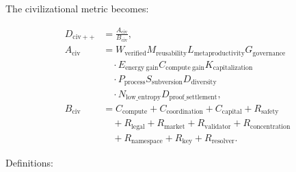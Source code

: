 \documentclass[
  11pt,
]{article}
\begin{document}
The civilizational metric becomes:

\[
\begin{aligned}
D_{\mathrm{civ++}}&=\frac{A_{\mathrm{civ}}}{B_{\mathrm{civ}}},\\[0.2em]
A_{\mathrm{civ}}&=W_{\mathrm{verified}}M_{\mathrm{reusability}}L_{\mathrm{metaproductivity}}
G_{\mathrm{governance}}\\
&\quad\cdot E_{\mathrm{energy\ gain}}C_{\mathrm{compute\ gain}}K_{\mathrm{capitalization}}\\
&\quad\cdot P_{\mathrm{process}}S_{\mathrm{subversion}}D_{\mathrm{diversity}}\\
&\quad\cdot N_{\mathrm{low\_entropy}}D_{\mathrm{proof\_settlement}},\\[0.2em]
B_{\mathrm{civ}}&=C_{\mathrm{compute}}+C_{\mathrm{coordination}}+C_{\mathrm{capital}}
+R_{\mathrm{safety}}\\
&\quad+R_{\mathrm{legal}}+R_{\mathrm{market}}+R_{\mathrm{validator}}
+R_{\mathrm{concentration}}\\
&\quad+R_{\mathrm{namespace}}+R_{\mathrm{key}}+R_{\mathrm{resolver}}.
\end{aligned}
\]

Definitions:
\end{document}
